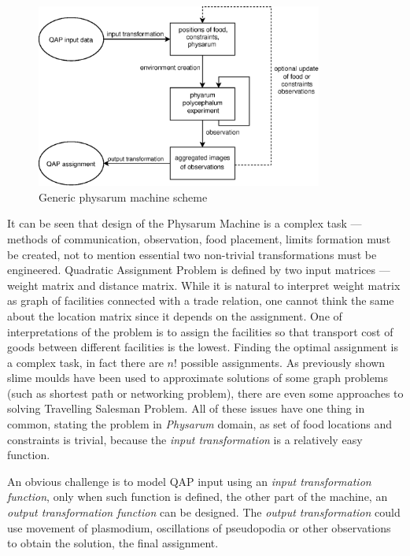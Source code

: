 \documentclass[english,a4paper,twoside]{ppfcmthesis}
\begin{document}
\begin{figure}
  \centering
  \includegraphics[width=0.84\textwidth]{algorithm/physarum_machine.eps}
  \caption{Generic physarum machine scheme}
  \label{figure:a_machine}
\end{figure}

It can be seen that design of the Physarum Machine is a complex task --- methods of communication, observation, food placement, limits formation must be created, not to mention essential two non-trivial transformations must be engineered. Quadratic Assignment Problem is defined by two input matrices --- weight matrix and distance matrix. While it is natural to interpret weight matrix as graph of facilities connected with a trade relation, one cannot think the same about the location matrix since it depends on the assignment. One of interpretations of the problem is to assign the facilities so that transport cost of goods between different facilities is the lowest. Finding the optimal assignment is a complex task, in fact there are $n!$ possible assignments. As previously shown slime moulds have been used to approximate solutions of some graph problems (such as shortest path or networking problem), there are even some approaches to solving Travelling Salesman Problem. All of these issues have one thing in common, stating the problem in \textit{Physarum} domain, as set of food locations and constraints is trivial, because the \textit{input transformation} is a relatively easy function. 

An obvious challenge is to model QAP input using an \textit{input transformation function}, only when such function is defined, the other part of the machine, an \textit{output transformation function} can be designed. The \textit{output transformation} could use movement of plasmodium, oscillations of pseudopodia or other observations to obtain the solution, the final assignment.
\end{document}
